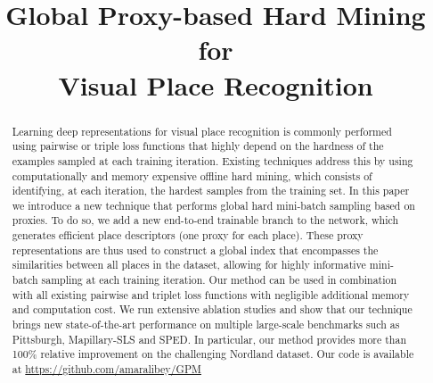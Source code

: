 \documentclass{bmvc2k}
\title{Global Proxy-based Hard Mining for \\Visual Place Recognition}
\begin{document}
\maketitle

\begin{abstract}
Learning deep representations for visual place recognition is commonly performed using pairwise or triple loss functions that highly depend on the hardness of the examples sampled at each training iteration. Existing techniques address this by using computationally and memory expensive offline hard mining, which consists of identifying, at each iteration, the hardest samples from the training set. In this paper we introduce a new technique that performs global hard mini-batch sampling based on proxies. To do so, we add a new end-to-end trainable branch to the network, which generates efficient place descriptors (one proxy for each place). These proxy representations are thus used to construct a global index that encompasses the similarities between all places in the dataset, allowing for highly informative mini-batch sampling at each training iteration. Our method can be used in combination with all existing pairwise and triplet loss functions with negligible additional memory and computation cost. We run extensive ablation studies and show that our technique brings new state-of-the-art performance on multiple large-scale benchmarks such as Pittsburgh, Mapillary-SLS and SPED. In particular, our method provides more than 100\% relative improvement on the challenging Nordland dataset. Our code is available at \url{https://github.com/amaralibey/GPM}
\end{abstract}
\end{document}
